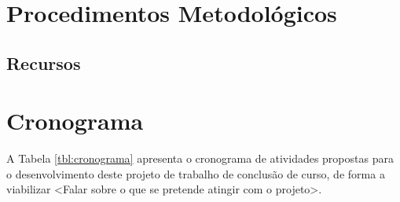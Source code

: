 \chapter{Procedimentos Metodológicos}
\label{chap:metodologia}

\section{Recursos}

\chapter{Cronograma}
\label{chap:cronograma}

A Tabela \ref{tbl:cronograma} apresenta o cronograma de atividades propostas para o desenvolvimento deste projeto de trabalho de conclusão de curso, de forma a viabilizar <Falar sobre o que se pretende atingir com o projeto>.

